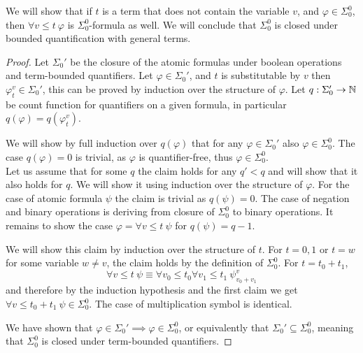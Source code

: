 \question{}
We will show that if $t$ is a term that does not contain the variable $v$, and $\varphi \in \Sigma_0^0$,
then $\forall v \le t\ \varphi$ is $\Sigma_0^0$-formula as well.
We will conclude that $\Sigma_0^0$ is closed under bounded quantification with general terms.
\begin{proof}
	Let $\Sigma_0'$ be the closure of the atomic formulas under boolean operations and term-bounded quantifiers.
	Let $\varphi \in \Sigma_0'$, and $t$ is substitutable by $v$ then $\varphi_t^v \in \Sigma_0'$, this can be proved by induction over the structure of $\varphi$.
	Let $q : \Sigma_0' \to \mathbb{N}$ be count function for quantifiers on a given formula, in particular $q(\varphi) = q(\varphi_t^v)$.
	
	We will show by full induction over $q(\varphi)$ that for any $\varphi \in \Sigma_0'$ also $\varphi \in \Sigma_0^0$.
	The case $q(\varphi) = 0$ is trivial, as $\varphi$ is quantifier-free, thus $\varphi \in \Sigma_0^0$. \\
	Let us assume that for some $q$ the claim holds for any $q' < q$ and will show that it also holds for $q$.
	We will show it using induction over the structure of $\varphi$.
	For the case of atomic formula $\psi$ the claim is trivial as $q(\psi) = 0$.
	The case of negation and binary operations is deriving from closure of $\Sigma_0^0$ to binary operations.
	It remains to show the case $\varphi = \forall v \le t\ \psi$ for $q(\psi) = q - 1$.

	We will show this claim by induction over the structure of $t$.
	For $t = 0, 1$ or $t = w$ for some variable $w \ne v$, the claim holds by the definition of $\Sigma_0^0$.
	For $t = t_0 + t_1$,
	\[
		\forall v \le t\ \psi
		\equiv \forall v_0 \le t_0 \forall v_1 \le t_1\ \psi_{v_0 + v_1}^v
	\]
	and therefore by the induction hypothesis and the first claim we get $\forall v \le t_0 + t_1\ \psi \in \Sigma_0^0$.
	The case of multiplication symbol is identical.

	We have shown that $\varphi \in \Sigma_0' \implies \varphi \in \Sigma_0^0$, or equivalently that $\Sigma_0' \subseteq \Sigma_0^0$,
	meaning that $\Sigma_0^0$ is closed under term-bounded quantifiers.
\end{proof}

